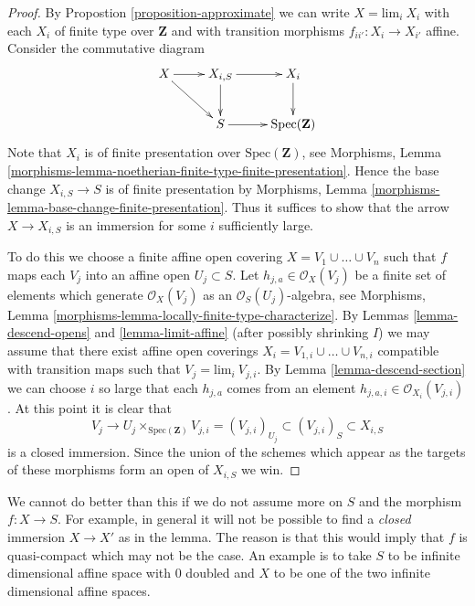 \begin{proof}
By Propostion \ref{proposition-approximate} we can write
$X = \text{lim}_i\ X_i$ with each $X_i$ of finite type over $\mathbf{Z}$ and
with transition morphisms $f_{ii'} : X_i \to X_{i'}$ affine.
Consider the commutative diagram
$$
\xymatrix{
X \ar[r] \ar[rd] & X_{i, S} \ar[r] \ar[d] & X_i \ar[d] \\
& S \ar[r] & \text{Spec}(\mathbf{Z})
}
$$
Note that $X_i$ is of finite presentation over $\text{Spec}(\mathbf{Z})$, see
Morphisms,
Lemma \ref{morphisms-lemma-noetherian-finite-type-finite-presentation}.
Hence the base change $X_{i, S} \to S$ is of finite presentation by
Morphisms, Lemma \ref{morphisms-lemma-base-change-finite-presentation}.
Thus it suffices to show that the arrow $X \to X_{i, S}$ is an
immersion for some $i$ sufficiently large.

\medskip\noindent
To do this we choose a finite affine open covering
$X = V_1 \cup \ldots \cup V_n$ such that
$f$ maps each $V_j$ into an affine open $U_j \subset S$.
Let $h_{j, a} \in \mathcal{O}_X(V_j)$ be a finite
set of elements which generate $\mathcal{O}_X(V_j)$ as
an $\mathcal{O}_S(U_j)$-algebra, see
Morphisms, Lemma \ref{morphisms-lemma-locally-finite-type-characterize}.
By Lemmas \ref{lemma-descend-opens} and \ref{lemma-limit-affine}
(after possibly shrinking $I$) we may assume that
there exist affine open coverings
$X_i = V_{1, i} \cup \ldots \cup V_{n, i}$
compatible with transition maps such that $V_j = \text{lim}_i\ V_{j, i}$.
By Lemma \ref{lemma-descend-section} we can choose $i$ so large that each
$h_{j, a}$ comes from an element
$h_{j, a, i} \in \mathcal{O}_{X_i}(V_{j, i})$.
At this point it is clear that
$$
V_j \longrightarrow U_j \times_{\text{Spec}(\mathbf{Z})} V_{j, i} =
(V_{j, i})_{U_j} \subset (V_{j, i})_S \subset X_{i, S}
$$
is a closed immersion. Since the union of the schemes which appear as
the targets of these morphisms form an open of $X_{i, S}$ we win.
\end{proof}

\begin{remark}
\label{remark-cannot-do-better}
We cannot do better than this if we do not assume
more on $S$ and the morphism $f : X \to S$.
For example, in general it will not be possible to
find a {\it closed} immersion $X \to X'$ as in the lemma.
The reason is that this would imply that $f$ is quasi-compact which
may not be the case. An example is to take $S$ to be infinite
dimensional affine space with $0$ doubled and $X$ to be one of
the two infinite dimensional affine spaces.
\end{remark}

